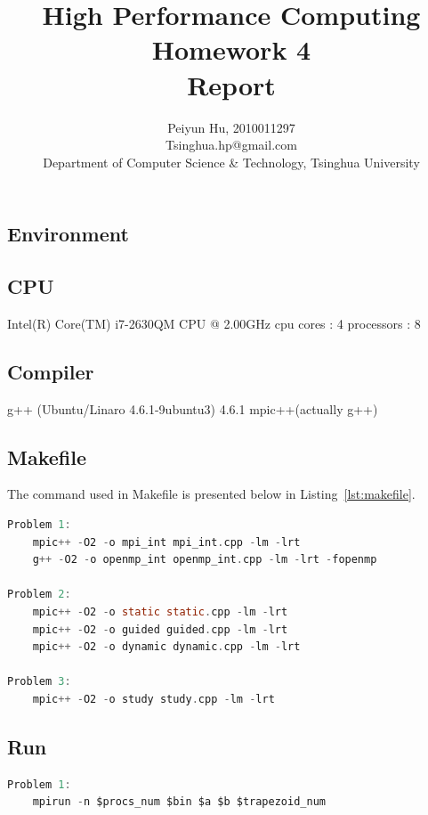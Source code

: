 \documentclass[a4paper]{article}   %
\begin{document}
\begin{CJK}{UTF8}{gbsn}
\begin{spacing}{1.2}

\title{High Performance Computing\\ Homework 4\\ Report}
\author{Peiyun Hu, 2010011297\\Tsinghua.hp@gmail.com\\ [1em]Department of Computer Science \& Technology, Tsinghua University}
\maketitle

\section{Environment}
\subsection{CPU}
Intel(R) Core(TM) i7-2630QM CPU @ 2.00GHz
cpu cores	: 4
processors	: 8
\subsection{Compiler}
g++ (Ubuntu/Linaro 4.6.1-9ubuntu3) 4.6.1
mpic++(actually g++)
\subsection{Makefile}
The command used in Makefile is presented below in Listing~\ref{lst:makefile}.
\begin{lstlisting}[language=C, label=lst:makefile, caption=Makefile Command]
Problem 1:
	mpic++ -O2 -o mpi_int mpi_int.cpp -lm -lrt
	g++ -O2 -o openmp_int openmp_int.cpp -lm -lrt -fopenmp

Problem 2:
	mpic++ -O2 -o static static.cpp -lm -lrt
	mpic++ -O2 -o guided guided.cpp -lm -lrt
	mpic++ -O2 -o dynamic dynamic.cpp -lm -lrt

Problem 3:
	mpic++ -O2 -o study study.cpp -lm -lrt
\end{lstlisting}
\subsection{Run}
\begin{lstlisting}[language=C, label=lst:makefile, caption=Makefile Command]
Problem 1:
	mpirun -n $procs_num $bin $a $b $trapezoid_num


\end{lstlisting}
\end{spacing}
\end{CJK}
\end{document}
